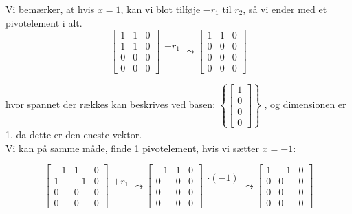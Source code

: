 \documentclass[a4paper,12pt]{article}
\begin{document}
Vi bemærker, at hvis $x = 1$, kan vi blot tilføje $-r_1$ til $r_2$, så vi ender med et pivotelement i alt.\\
\[
\left[\begin{array}{cc|c}
    1 & 1 & 0\\
    1 & 1 & 0\\
    0 & 0 & 0\\
    0 & 0 & 0
\end{array}\right]
\begin{array}{ccc}
    \\
    -r_1\\
    \\
    \\
\end{array}
\leadsto
\left[\begin{array}{cc|c}
    1 & 1 & 0\\
    0 & 0 & 0\\
    0 & 0 & 0\\
    0 & 0 & 0
\end{array}\right]
\]

hvor spannet der rækkes kan beskrives ved basen: $\left\{ \left[\begin{array}{cc|c}
    1\\
    0\\
    0\\
    0 
\end{array}\right] \right\}$
, og dimensionen er 1, da dette er den eneste vektor.\\

Vi kan på samme måde, finde 1 pivotelement, hvis vi sætter $x = -1$:

\[
\left[\begin{array}{cc|c}
    -1 & 1 & 0\\
    1 & -1 & 0\\
    0 & 0 & 0\\
    0 & 0 & 0
\end{array}\right]
\begin{array}{ccc}
    \\
    +r_1\\
    \\
    \\
\end{array}
\leadsto
\left[\begin{array}{cc|c}
    -1 & 1 & 0\\
    0 & 0 & 0\\
    0 & 0 & 0\\
    0 & 0 & 0
\end{array}\right]
\begin{array}{ccc}
    \cdot (-1)\\
    \\
    \\
    \\
\end{array}
\leadsto
\left[\begin{array}{cc|c}
    1 & -1 & 0\\
    0 & 0 & 0\\
    0 & 0 & 0\\
    0 & 0 & 0
\end{array}\right]
\]
\end{document}
